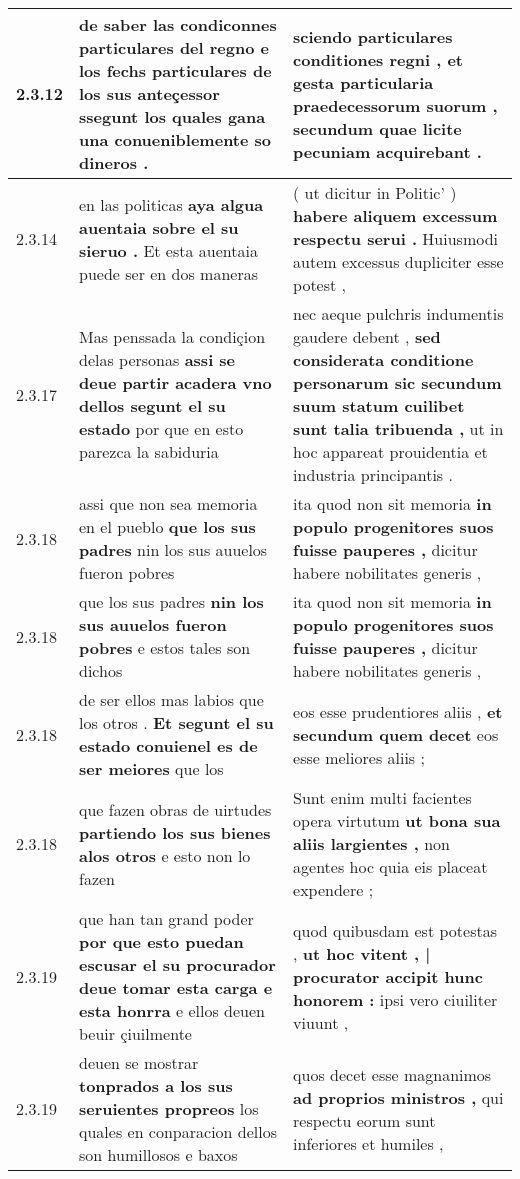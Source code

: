 \begin{tabular}{|p{1cm}|p{6.5cm}|p{6.5cm}|}
2.3.12 & de saber las condiconnes particulares del regno \textbf{ e los fechs particulares de los sus anteçessor } ssegunt los quales gana una conueniblemente so dineros . & sciendo particulares conditiones regni , \textbf{ et gesta particularia praedecessorum suorum , } secundum quae licite pecuniam acquirebant . \\\hline
2.3.14 & en las politicas \textbf{ aya algua auentaia sobre el su sieruo . } Et esta auentaia puede ser en dos maneras & ( ut dicitur in Politic’ ) \textbf{ habere aliquem excessum respectu serui . } Huiusmodi autem excessus dupliciter esse potest , \\\hline
2.3.17 & Mas penssada la condiçion delas personas \textbf{ assi se deue partir acadera vno dellos segunt el su estado } por que en esto parezca la sabiduria & nec aeque pulchris indumentis gaudere debent , \textbf{ sed considerata conditione personarum sic secundum suum statum cuilibet sunt talia tribuenda , } ut in hoc appareat prouidentia et industria principantis . \\\hline
2.3.18 & assi que non sea memoria en el pueblo \textbf{ que los sus padres } nin los sus auuelos fueron pobres & ita quod non sit memoria \textbf{ in populo progenitores suos fuisse pauperes , } dicitur habere nobilitates generis , \\\hline
2.3.18 & que los sus padres \textbf{ nin los sus auuelos fueron pobres } e estos tales son dichos & ita quod non sit memoria \textbf{ in populo progenitores suos fuisse pauperes , } dicitur habere nobilitates generis , \\\hline
2.3.18 & de ser ellos mas labios que los otros . \textbf{ Et segunt el su estado conuienel es de ser meiores } que los & eos esse prudentiores aliis , \textbf{ et secundum quem decet } eos esse meliores aliis ; \\\hline
2.3.18 & que fazen obras de uirtudes \textbf{ partiendo los sus bienes alos otros } e esto non lo fazen & Sunt enim multi facientes opera virtutum \textbf{ ut bona sua aliis largientes , } non agentes hoc quia eis placeat expendere ; \\\hline
2.3.19 & que han tan grand poder \textbf{ por que esto puedan escusar el su procurador deue tomar esta carga e esta honrra } e ellos deuen beuir çiuilmente & quod quibusdam est potestas , \textbf{ ut hoc vitent , | procurator accipit hunc honorem : } ipsi vero ciuiliter viuunt , \\\hline
2.3.19 & deuen se mostrar \textbf{ tonprados a los sus seruientes propreos } los quales en conparacion dellos son humillosos e baxos & quos decet esse magnanimos \textbf{ ad proprios ministros , } qui respectu eorum sunt inferiores et humiles , \\\hline

\end{tabular}
